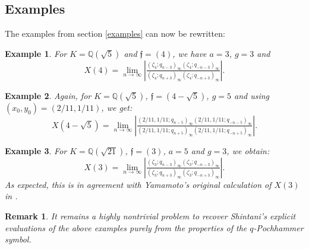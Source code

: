 \documentclass[11pt, a4paper]{amsart}
\newcommand{\eq}[1]{\begin{equation}#1\end{equation}}
\theoremstyle{plain}
\newtheorem{example}{Example}[section]
\newtheorem{remark}{Remark}[section]
\numberwithin{equation}{section}
\begin{document}
\subsection{Examples}
The examples from section \ref{examples} can now be rewritten:
\begin{example}
For $K = \mathbb Q(\sqrt{5})$ and $\mathfrak f = (4)$, we have $a=3$, $g=3$ and 
\eq{X(4) = \lim_{n\to \infty} \left \vert \tfrac{(\zeta_4;q_{n-3})_\infty (\zeta_4;q_{-n-3})_\infty}{(\zeta_4;q_{n+3})_\infty (\zeta_4;q_{-n+3})_\infty} \right\vert .}
\end{example}
\begin{example}
Again, for $K = \mathbb Q(\sqrt{5})$, $\mathfrak f = (4-\sqrt{5})$, $g=5$ and using $(x_0,y_0) = (2/11,1/11)$, we get: 
\eq{X(4-\sqrt{5}) = \lim_{n\to \infty} \left \vert \tfrac{(2/11,1/11;q_{n-5})_\infty (2/11,1/11;q_{-n-5})_\infty}{(2/11,1/11;q_{n+5})_\infty (2/11,1/11;q_{-n+5})_\infty} \right\vert .}
\end{example}
\begin{example}
For $K = \mathbb Q(\sqrt{21})$, $\mathfrak f = (3)$, $a=5$ and $g=3$, we obtain: 
\eq{X(3) = \lim_{n\to \infty} \left \vert \tfrac{(\zeta_3;q_{n-3})_\infty (\zeta_3;q_{-n-3})_\infty}{(\zeta_3;q_{n+3})_\infty (\zeta_3;q_{-n+3})_\infty} \right\vert .}
As expected, this is in agreement with Yamamoto's original calculation of $X(3)$ in \cite{yamamoto2010factorization}.
\end{example}
\begin{remark}
It remains a highly nontrivial problem to recover Shintani’s explicit evaluations of the above examples purely from the properties of the $q$-Pochhammer symbol.
\end{remark}
\appendix
\end{document}
